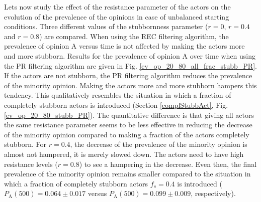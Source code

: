 \documentclass[11 pt , letterpaper , twoside , openright]{book}
\begin{document}
Lets now study the effect of the resistance parameter of the actors on the evolution of the prevalence of the opinions in case of unbalanced starting conditions. Three different values of the stubbornness parameter ($r=0$, $r=0.4$ and $r=0.8$) are compared. When using the REC filtering algorithm, the prevalence of opinion A versus time is not affected by making the actors more and more stubborn. Results for the prevalence of opinion A over time when using the PR filtering algorithm are given in Fig. \ref{ev_op_20_80_all_frac_stubb_PR}. If the actors are not stubborn, the PR filtering algorithm reduces the prevalence of the minority opinion. Making the actors more and more stubborn hampers this tendency. This qualitatively resembles the situation in which a fraction of completely stubborn actors is introduced (Section \ref{complStubbAct}, Fig. \ref{ev_op_20_80_stubb_PR}). The quantitative difference is that giving all actors the same resistance parameter seems to be less effective in reducing the decrease of the minority opinion compared to making a fraction of the actors completely stubborn. For $r=0.4$, the decrease of the prevalence of the minority opinion is almost not hampered, it is merely slowed down. The actors need to have high resistance levels ($r=0.8$) to see a hampering in the decrease. Even then, the final prevalence of the minority opinion remains smaller compared to the situation in which a fraction of completely stubborn actors $f_s=0.4$ is introduced ($P_\text{A}(500) = 0.064 \pm 0.017$ versus $P_\text{A}(500) = 0.099 \pm 0.009$, respectively).
\newpage
\end{document}
